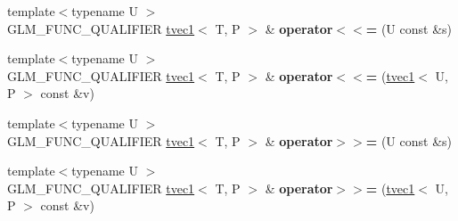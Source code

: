 \begin{DoxyCompactItemize}
\item 
\hypertarget{structglm_1_1detail_1_1tvec1_a7ff4b3a808e1ef7000ad8d41d7a428bb}{{\footnotesize template$<$typename U $>$ }\\G\-L\-M\-\_\-\-F\-U\-N\-C\-\_\-\-Q\-U\-A\-L\-I\-F\-I\-E\-R \hyperlink{structglm_1_1detail_1_1tvec1}{tvec1}$<$ T, P $>$ \& {\bfseries operator$<$$<$=} (U const \&s)}\label{structglm_1_1detail_1_1tvec1_a7ff4b3a808e1ef7000ad8d41d7a428bb}

\item 
\hypertarget{structglm_1_1detail_1_1tvec1_a61fb7165bc6cf2c741e7aea9af680e60}{{\footnotesize template$<$typename U $>$ }\\G\-L\-M\-\_\-\-F\-U\-N\-C\-\_\-\-Q\-U\-A\-L\-I\-F\-I\-E\-R \hyperlink{structglm_1_1detail_1_1tvec1}{tvec1}$<$ T, P $>$ \& {\bfseries operator$<$$<$=} (\hyperlink{structglm_1_1detail_1_1tvec1}{tvec1}$<$ U, P $>$ const \&v)}\label{structglm_1_1detail_1_1tvec1_a61fb7165bc6cf2c741e7aea9af680e60}

\item 
\hypertarget{structglm_1_1detail_1_1tvec1_a9f9d23540183bc4baa3b01052f61e0f9}{{\footnotesize template$<$typename U $>$ }\\G\-L\-M\-\_\-\-F\-U\-N\-C\-\_\-\-Q\-U\-A\-L\-I\-F\-I\-E\-R \hyperlink{structglm_1_1detail_1_1tvec1}{tvec1}$<$ T, P $>$ \& {\bfseries operator$>$$>$=} (U const \&s)}\label{structglm_1_1detail_1_1tvec1_a9f9d23540183bc4baa3b01052f61e0f9}

\item 
\hypertarget{structglm_1_1detail_1_1tvec1_a6867d5e71d657b7d5498979ab8d8f1cf}{{\footnotesize template$<$typename U $>$ }\\G\-L\-M\-\_\-\-F\-U\-N\-C\-\_\-\-Q\-U\-A\-L\-I\-F\-I\-E\-R \hyperlink{structglm_1_1detail_1_1tvec1}{tvec1}$<$ T, P $>$ \& {\bfseries operator$>$$>$=} (\hyperlink{structglm_1_1detail_1_1tvec1}{tvec1}$<$ U, P $>$ const \&v)}\label{structglm_1_1detail_1_1tvec1_a6867d5e71d657b7d5498979ab8d8f1cf}

\end{DoxyCompactItemize}
